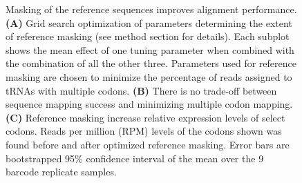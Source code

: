 \documentclass[9pt,lineno]{elife}
\begin{document}
\begin{figure}[ht!]
\centering
{}
\caption{
Masking of the reference sequences improves alignment performance.
\textbf{(A)} Grid search optimization of parameters determining the extent of reference masking (see method section for details).
Each subplot shows the mean effect of one tuning parameter when combined with the combination of all the other three.
Parameters used for reference masking are chosen to minimize the percentage of reads assigned to tRNAs with multiple codons.
\textbf{(B)} There is no trade-off between sequence mapping success and minimizing multiple codon mapping.
\textbf{(C)} Reference masking increase relative expression levels of select codons. 
Reads per million (RPM) levels of the codons shown was found before and after optimized reference masking.
Error bars are bootstrapped 95\% confidence interval of the mean over the 9  barcode replicate samples.
}
\label{fig:Fig3}

\label{figsupp:f3S1}


\end{figure}
\end{document}
